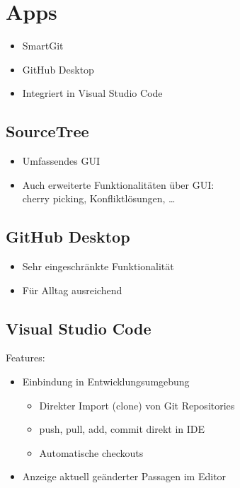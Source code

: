 \section{Apps}
\begin{frame}
\begin{itemize}
	\item SmartGit
	\item GitHub Desktop
	\item Integriert in Visual Studio Code
\end{itemize}
\end{frame}

\subsection{SourceTree}
\begin{frame}
\begin{itemize}
\item Umfassendes GUI
\item Auch erweiterte Funktionalitäten über GUI:\\
cherry picking, Konfliktlösungen, …
\end{itemize}
\end{frame}

\subsection{GitHub Desktop}
\begin{frame}
\begin{itemize}
\item Sehr eingeschränkte Funktionalität
\item Für Alltag ausreichend
\end{itemize}
\end{frame}

\subsection{Visual Studio Code}
\begin{frame}
Features:
\begin{itemize}
	\item <2->Einbindung in Entwicklungsumgebung
	\begin{itemize}
		\item <3->Direkter Import (clone) von Git Repositories
		\item <4->push, pull, add, commit direkt in IDE
		\item <5->Automatische checkouts
	\end{itemize}
	\item <6->Anzeige aktuell geänderter Passagen im Editor
\end{itemize}
\end{frame}